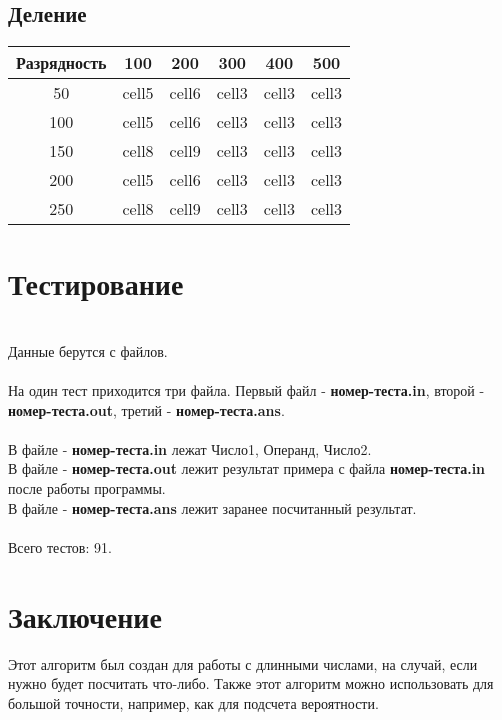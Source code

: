 \documentclass[a4paper]{article}
\begin{document}
\subsection{Деление}
\begin{center}
\begin{tabular}{ |c|c|c|c|c|c|}
\hline
Разрядность & 100 & 200 & 300 & 400 & 500 \\ 
\hline
50 & cell5 & cell6 & cell3 & cell3 & cell3\\  
100 & cell5 & cell6 & cell3 & cell3 & cell3\\  
150 & cell8 & cell9 & cell3 & cell3 & cell3\\
200 & cell5 & cell6 & cell3 & cell3 & cell3\\  
250 & cell8 & cell9 & cell3 & cell3 & cell3\\
\hline
\end{tabular}
\end{center}
\newpage

\section{Тестирование}
\\Данные берутся с файлов.
\\
\\На один тест приходится три файла. Первый файл - \textbf{номер-теста.in}, второй - \textbf{номер-теста.out}, третий - \textbf{номер-теста.ans}.
\\
\\В файле - \textbf{номер-теста.in} лежат Число1, Операнд, Число2.
\\В файле - \textbf{номер-теста.out} лежит результат примера с файла \textbf{номер-теста.in} после работы программы.
\\В файле - \textbf{номер-теста.ans} лежит заранее посчитанный результат.
\\
\\Всего тестов: 91.
\newpage

\section{Заключение}
Этот алгоритм был создан для работы с длинными числами, на случай, если нужно будет посчитать что-либо. Также этот алгоритм можно использовать для большой точности, например, как для подсчета вероятности.
\newpage


\end{document}
